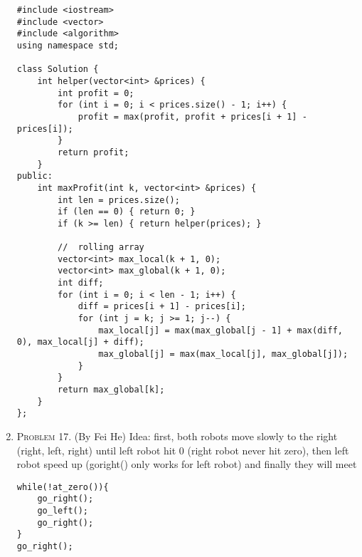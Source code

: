 \documentclass[10pt, onecolumn, draftcls]{IEEEtran}
\begin{document}
\begin{enumerate}
\begin{lstlisting}
#include <iostream>
#include <vector>
#include <algorithm>
using namespace std;

class Solution {
    int helper(vector<int> &prices) {
        int profit = 0;
        for (int i = 0; i < prices.size() - 1; i++) {
            profit = max(profit, profit + prices[i + 1] - prices[i]);
        }
        return profit;
    }
public:
    int maxProfit(int k, vector<int> &prices) {
        int len = prices.size();
        if (len == 0) { return 0; }
        if (k >= len) { return helper(prices); }

        //  rolling array
        vector<int> max_local(k + 1, 0);
        vector<int> max_global(k + 1, 0);
        int diff;
        for (int i = 0; i < len - 1; i++) {
            diff = prices[i + 1] - prices[i];
            for (int j = k; j >= 1; j--) {
                max_local[j] = max(max_global[j - 1] + max(diff, 0), max_local[j] + diff);
                max_global[j] = max(max_local[j], max_global[j]);
            }
        }
        return max_global[k];
    }
};
\end{lstlisting}
 

\item \textsc{Problem 17.} (By Fei He) Idea: first, both robots move slowly to the right (right, left, right) until left robot hit 0 (right robot never hit zero), then left robot speed up (goright() only works for left robot) and finally they will meet

\begin{lstlisting}
while(!at_zero()){
    go_right();
    go_left();
    go_right();
} 
go_right();

\end{lstlisting}
\end{enumerate}
\end{document}
